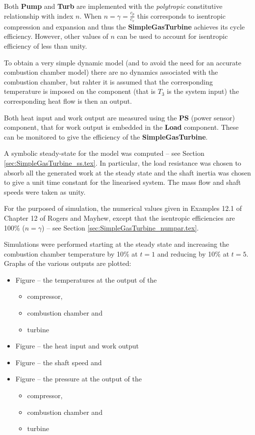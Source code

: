Both \textbf{Pump} and \textbf{Turb} are implemented with the
\emph{polytropic} constitutive relationship with index $n$. When
$n=\gamma=\frac{c_p}{c_v}$ this corresponds to isentropic compression
and expansion and thus the \textbf{SimpleGasTurbine} achieves its
cycle efficiency. However, other values of $n$ can be used to account
for isentropic efficiency of less than unity.

To obtain a very simple dynamic model (and to avoid the need for an
accurate combustion chamber model) there are no dynamics associated
with the combustion chamber, but rahter it is assumed that the
corresponding temperature is imposed on the component (that is $T_3$
is the system input) the corresponding heat flow is then an output.

Both heat input and work output are measured using the \textbf{PS}
(power sensor) component, that for work output is embedded in the
\textbf{Load} component. These can be monitored to give the efficiency
of the \textbf{SimpleGasTurbine}.

A symbolic steady-state for the model was computed -- see Section
\ref{sec:SimpleGasTurbine_ss.tex}. In particular, the load
resistance was chosen to absorb all the generated work at the steady
state and the shaft inertia was chosen to give a unit time constant
for the linearised system. The mass flow and shaft speeds were taken
as unity.

For the purposed of simulation, the numerical values given in Examples
12.1 of Chapter 12 of Rogers and Mayhew, except that the isentropic
efficiencies are 100\% ($n=\gamma$) -- see Section
\ref{sec:SimpleGasTurbine_numpar.tex}.

Simulations were performed starting at the steady state and increasing
the combustion chamber temperature by 10\% at $t=1$ and reducing by
10\% at $t=5$. Graphs of the various outputs are plotted:
\begin{itemize}
\item Figure
  -- the temperatures at the output of the
  \begin{itemize}
  \item compressor,
  \item combustion chamber and
  \item turbine
  \end{itemize}
\item Figure
  -- the heat input and work output
\item Figure
   -- the shaft speed and
\item Figure
  -- the pressure at the output of the
  \begin{itemize}
  \item compressor,
  \item combustion chamber and
  \item turbine
  \end{itemize}
\end{itemize}

